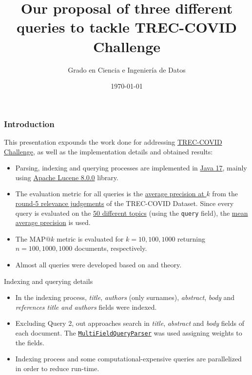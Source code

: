 \documentclass[10pt]{beamer}
\title{Our proposal of three different queries to tackle TREC-COVID Challenge}
\author{Grado en Ciencia e Ingeniería de Datos}
\institute{Universidade da Coruña}
\date{\today}
\begin{document}
\frame{\titlepage}

\begin{frame}
    \frametitle{Introduction}
    This presentation expounds the work done for addressing \href{https://ir.nist.gov/trec-covid/}{TREC-COVID Challenge}, as well as the implementation details and obtained results:

    \begin{itemize}
        \item Parsing, indexing and querying processes are implemented in \href{https://www.oracle.com/java/technologies/javase/jdk17-archive-downloads.html}{Java 17}, mainly using \href{https://lucene.apache.org/}{Apache Lucene 8.0.0} library. 
        \item The evaluation metric for all queries is the \href{https://amitness.com/2020/08/information-retrieval-evaluation/\#2-average-precisionap}{average precision at $k$} from the \href{https://ir.nist.gov/trec-covid/data/qrels-covid_d5_j0.5-5.txt}{round-5 relevance judgements} of the TREC-COVID Dataset. Since every query is  evaluated on the \href{https://ir.nist.gov/trec-covid/data/topics-rnd5.xml}{50 different topics} (using the \texttt{query} field), the \href{https://blog.paperspace.com/mean-average-precision/}{mean average precision} is used.
        \item The MAP$@k$ metric is evaluated for $k=10, 100, 1000$ returning $n=100, 1000, 1000$ documents, respectively.
        \item Almost all queries were developed based on \cite{schutze2008introduction} and \cite{croft2010search} theory.
    \end{itemize}
\end{frame}

\begin{frame}{Indexing and querying details}
    \begin{itemize}
        \item In the indexing process, \textit{title}, \textit{authors} (only surnames), \textit{abstract}, \textit{body} and \textit{references title and authors} fields were indexed.
        \item Excluding Query 2, out approaches search in \textit{title}, \textit{abstract} and \textit{body} fields of each document. The \href{https://lucene.apache.org/core/6_0_0/queryparser/org/apache/lucene/queryparser/classic/MultiFieldQueryParser.html}{\texttt{MultiFieldQueryParser}} was used assigning weights to the fields.
        \item Indexing process and some computational-expensive queries are parallelized in order to reduce run-time.
    \end{itemize}
\end{frame}
\end{document}
